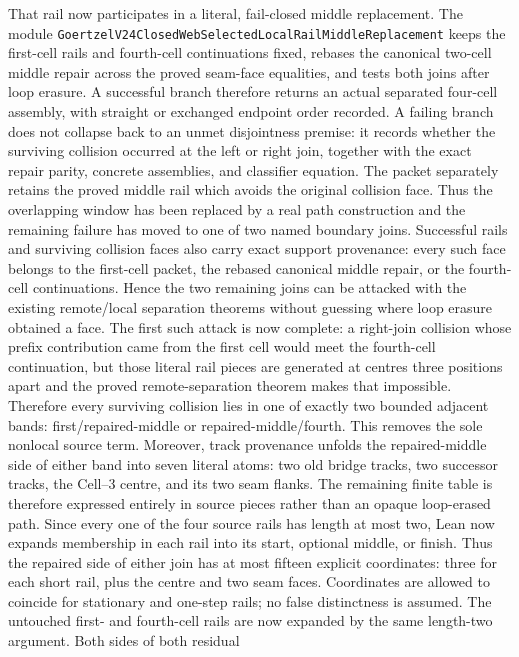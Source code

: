 \documentclass[11pt]{article}
\theoremstyle{definition}
\begin{document}
That rail now participates in a literal, fail-closed middle replacement.
The module
\texttt{GoertzelV24ClosedWebSelectedLocalRailMiddleReplacement}
keeps the first-cell rails and fourth-cell continuations fixed, rebases the
canonical two-cell middle repair across the proved seam-face equalities, and
tests both joins after loop erasure.  A successful branch therefore returns
an actual separated four-cell assembly, with straight or exchanged endpoint
order recorded.  A failing branch does not collapse back to an unmet
disjointness premise: it records whether the surviving collision occurred at
the left or right join, together with the exact repair parity, concrete
assemblies, and classifier equation.  The packet separately retains the
proved middle rail which avoids the original collision face.  Thus the
overlapping window has been replaced by a real path construction and the
remaining failure has moved to one of two named boundary joins.  Successful
rails and surviving collision faces also carry exact support provenance:
every such face belongs to the first-cell packet, the rebased canonical
middle repair, or the fourth-cell continuations.  Hence the two remaining
joins can be attacked with the existing remote/local separation theorems
without guessing where loop erasure obtained a face.  The first such attack
is now complete: a right-join collision whose prefix contribution came from
the first cell would meet the fourth-cell continuation, but those literal
rail pieces are generated at centres three positions apart and the proved
remote-separation theorem makes that impossible.  Therefore every surviving
collision lies in one of exactly two bounded adjacent bands:
first/repaired-middle or repaired-middle/fourth.  This removes the sole
nonlocal source term.  Moreover, track provenance unfolds the repaired-middle
side of either band into seven literal atoms: two old bridge tracks, two
successor tracks, the Cell--3 centre, and its two seam flanks.  The remaining
finite table is therefore expressed entirely in source pieces rather than an
opaque loop-erased path.  Since every one of the four source rails has length
at most two, Lean now expands membership in each rail into its start, optional
middle, or finish.  Thus the repaired side of either join has at most fifteen
explicit coordinates: three for each short rail, plus the centre and two seam
faces.  Coordinates are allowed to coincide for stationary and one-step rails;
no false distinctness is assumed.  The untouched first- and fourth-cell rails
are now expanded by the same length-two argument.  Both sides of both residual
\end{document}
